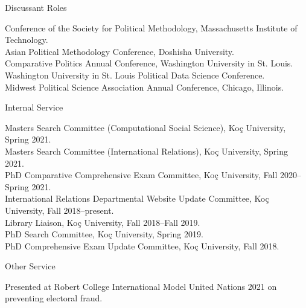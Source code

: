\documentclass[12pt]{article}
\begin{document}
\vspace{.45cm}

\begin{minipage}[t]{.3\textwidth}
Discussant Roles\\
\end{minipage}
\begin{minipage}[t]{.6\textwidth}
 Conference of the Society for Political Methodology, Massachusetts Institute of Technology.\\
\vspace{.1cm}
 Asian Political Methodology Conference, Doshisha University.\\
\vspace{.1cm}
 Comparative Politics Annual Conference, Washington University in St. Louis.\\
\vspace{.1cm}
 Washington University in St. Louis Political Data Science Conference.\\
\vspace{.1cm}
 Midwest Political Science Association Annual Conference, Chicago, Illinois.\\
\end{minipage}


\vspace{.45cm}

\begin{minipage}[t]{.3\textwidth}
Internal Service\\
\end{minipage}
\begin{minipage}[t]{.6\textwidth}
\FlushLeft
Masters Search Committee (Computational Social Science), Ko\c{c} University, Spring 2021.\\
\vspace{.1cm}
\FlushLeft
Masters Search Committee (International Relations), Ko\c{c} University, Spring 2021.\\
\vspace{.1cm}
\FlushLeft PhD Comparative Comprehensive Exam Committee, Ko\c{c} University, Fall 2020--Spring 2021.\\
\vspace{.1cm}
\FlushLeft International Relations Departmental Website Update Committee, Ko\c{c} University, Fall 2018--present.\\
\vspace{.1cm}
\FlushLeft Library Liaison, Ko\c{c} University, Fall 2018--Fall 2019.\\
\vspace{.1cm}
\FlushLeft PhD Search Committee, Ko\c{c} University, Spring 2019.\\
\vspace{.1cm}
\FlushLeft PhD Comprehensive Exam Update Committee, Ko\c{c} University, Fall 2018.\\
\end{minipage}

\vspace{.45cm}

\begin{minipage}[t]{.3\textwidth}
Other Service\\
\end{minipage}
\begin{minipage}[t]{.6\textwidth}
\FlushLeft Presented at Robert College International Model United Nations 2021 on preventing electoral fraud.
\end{minipage}
\end{document}
